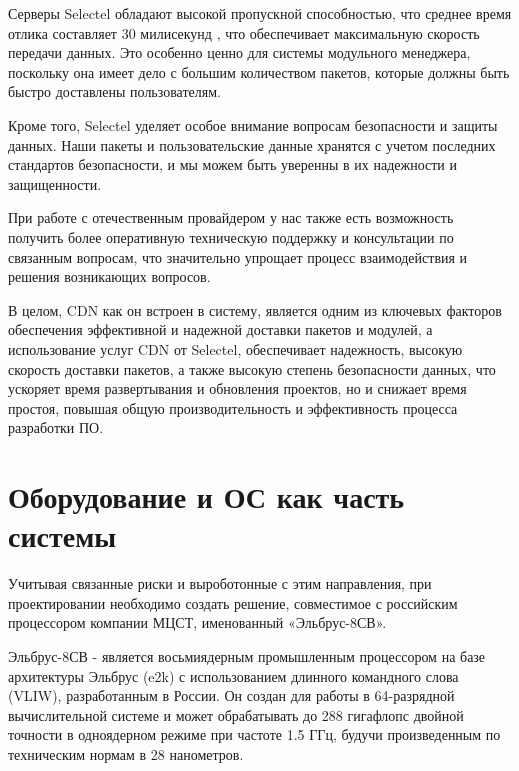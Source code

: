 Серверы Selectel обладают высокой пропускной способностью, что среднее время отлика составляет 30 милисекунд \cite{cdn:selectel}, что обеспечивает максимальную скорость передачи данных. Это особенно ценно для системы модульного менеджера, поскольку она имеет дело с большим количеством пакетов, которые должны быть быстро доставлены пользователям.

Кроме того, Selectel уделяет особое внимание вопросам безопасности и защиты данных. Наши пакеты и пользовательские данные хранятся с учетом последних стандартов безопасности, и мы можем быть уверенны в их надежности и защищенности.

При работе с отечественным провайдером у нас также есть возможность получить более оперативную техническую поддержку и консультации по связанным вопросам, что значительно упрощает процесс взаимодействия и решения возникающих вопросов.

В целом, CDN как он встроен в систему, является одним из ключевых факторов обеспечения эффективной и надежной доставки пакетов и модулей, а использование услуг CDN от Selectel, обеспечивает надежность, высокую скорость доставки пакетов, а также высокую степень безопасности данных, что ускоряет время развертывания и обновления проектов, но и снижает время простоя, повышая общую производительность и эффективность процесса разработки ПО.

\section{Оборудование и ОС как часть системы}

Учитывая связанные риски и выроботонные с этим направления, при проектировании необходимо создать решение, совместимое с российским процессором компании МЦСТ, именованный «Эльбрус-8СВ». \cite{dev:elbrus_cpu}

Эльбрус-8СВ - является восьмиядерным промышленным процессором на базе архитектуры Эльбрус (e2k) с использованием длинного командного слова (VLIW), разработанным в России. Он создан для работы в 64-разрядной вычислительной системе и может обрабатывать до 288 гигафлопс двойной точности в одноядерном режиме при частоте 1.5 ГГц, будучи произведенным по техническим нормам в 28 нанометров. 



